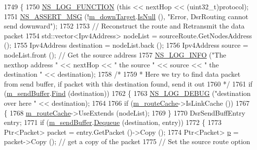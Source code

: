 \begin{DoxyCode}
1749 \{
1750   \hyperlink{log-macros-disabled_8h_a90b90d5bad1f39cb1b64923ea94c0761}{NS\_LOG\_FUNCTION} (\textcolor{keyword}{this} << nextHop << (uint32\_t)protocol);
1751   \hyperlink{assert_8h_aff5ece9066c74e681e74999856f08539}{NS\_ASSERT\_MSG} (!\hyperlink{classns3_1_1dsr_1_1DsrRouting_aa1eb6ea60fdf9ba2cac2079a74ce1ca4}{m\_downTarget}.\hyperlink{classns3_1_1Callback_aa8e27826badbf37f84763f36f70d9b54}{IsNull} (), \textcolor{stringliteral}{"Error, DsrRouting cannot send
       downward"});
1752 
1753   \textcolor{comment}{// Reconstruct the route and Retransmit the data packet}
1754   std::vector<Ipv4Address> nodeList = sourceRoute.GetNodesAddress ();
1755   Ipv4Address destination = nodeList.back ();
1756   Ipv4Address source = nodeList.front ();       \textcolor{comment}{// Get the source address}
1757   \hyperlink{group__logging_gafbd73ee2cf9f26b319f49086d8e860fb}{NS\_LOG\_INFO} (\textcolor{stringliteral}{"The nexthop address "} << nextHop << \textcolor{stringliteral}{" the source "} << source << \textcolor{stringliteral}{" the
       destination "} << destination);
1758   \textcolor{comment}{/*}
1759 \textcolor{comment}{   * Here we try to find data packet from send buffer, if packet with this destination found, send it out}
1760 \textcolor{comment}{   */}
1761   \textcolor{keywordflow}{if} (\hyperlink{classns3_1_1dsr_1_1DsrRouting_a887ae39d7060171753c0605d5c120549}{m\_sendBuffer}.\hyperlink{classns3_1_1dsr_1_1DsrSendBuffer_acf27d9e92a1d1960b9094c4108724a53}{Find} (destination))
1762     \{
1763       \hyperlink{group__logging_ga413f1886406d49f59a6a0a89b77b4d0a}{NS\_LOG\_DEBUG} (\textcolor{stringliteral}{"destination over here "} << destination);
1764 
1766       \textcolor{keywordflow}{if} (\hyperlink{classns3_1_1dsr_1_1DsrRouting_ac409bdb961b9fff0fb63ebd026be99ad}{m\_routeCache}->IsLinkCache ())
1767         \{
1768           \hyperlink{classns3_1_1dsr_1_1DsrRouting_ac409bdb961b9fff0fb63ebd026be99ad}{m\_routeCache}->UseExtends (nodeList);
1769         \}
1770       DsrSendBuffEntry entry;
1771       \textcolor{keywordflow}{if} (\hyperlink{classns3_1_1dsr_1_1DsrRouting_a887ae39d7060171753c0605d5c120549}{m\_sendBuffer}.\hyperlink{classns3_1_1dsr_1_1DsrSendBuffer_a31b49398ddb6a97b6ef27daa0d4ff6d7}{Dequeue} (destination, entry))
1772         \{
1773           Ptr<Packet> packet = entry.GetPacket ()->Copy ();
1774           Ptr<Packet> \hyperlink{lte__link__budget_8m_ac9de518908a968428863f829398a4e62}{p} = packet->Copy ();      \textcolor{comment}{// get a copy of the packet}
1775           \textcolor{comment}{// Set the source route option}

\end{DoxyCode}
